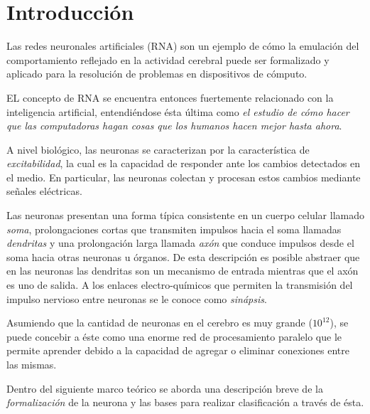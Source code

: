 \documentclass[journal]{IEEEtran}
\begin{document}
\section{Introducción}
\label{sec:introduccion}

Las redes neuronales artificiales (RNA) son un ejemplo de cómo la emulación del comportamiento reflejado en la actividad cerebral puede ser formalizado y aplicado para la resolución de problemas en dispositivos de cómputo.

EL concepto de RNA se encuentra entonces fuertemente relacionado con la inteligencia artificial, entendiéndose ésta última como \emph{el estudio de cómo hacer que las computadoras hagan cosas que los humanos hacen mejor hasta ahora}.

A nivel biológico, las neuronas se caracterizan por la característica de \emph{excitabilidad}, la cual es la capacidad de responder ante los cambios detectados en el medio.
En particular, las neuronas colectan y procesan estos cambios mediante señales eléctricas.

Las neuronas presentan una forma típica consistente en un cuerpo celular llamado \emph{soma}, prolongaciones cortas que transmiten impulsos hacia el soma llamadas \emph{dendritas} y una prolongación larga llamada \emph{axón} que conduce impulsos desde el soma hacia otras neuronas u órganos.
De esta descripción es posible abstraer que en las neuronas las dendritas son un mecanismo de entrada mientras que el axón es uno de salida.
A los enlaces electro-químicos que permiten la transmisión del impulso nervioso entre neuronas se le conoce como \emph{sinápsis}.

Asumiendo que la cantidad de neuronas en el cerebro es muy grande ($10^{12}$), se puede concebir a éste como una enorme red de procesamiento paralelo que le permite aprender debido a la capacidad de agregar o eliminar conexiones entre las mismas. 

Dentro del siguiente marco teórico se aborda una descripción breve de la \emph{formalización} de la neurona y las bases para realizar clasificación a través de ésta.
\end{document}
